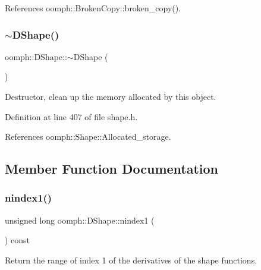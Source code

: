 References oomph\+::\+Broken\+Copy\+::broken\+\_\+copy().

\mbox{\label{classoomph_1_1DShape_a438b78cc767e134d1837bbf181cf4c07}} 
\subsubsection{\texorpdfstring{$\sim$\+D\+Shape()}{~DShape()}}
{\footnotesize\ttfamily oomph\+::\+D\+Shape\+::$\sim$\+D\+Shape (\begin{DoxyParamCaption}{ }\end{DoxyParamCaption})\hspace{0.3cm}{\ttfamily [inline]}}



Destructor, clean up the memory allocated by this object. 



Definition at line 407 of file shape.\+h.



References oomph\+::\+Shape\+::\+Allocated\+\_\+storage.



\subsection{Member Function Documentation}
\mbox{\label{classoomph_1_1DShape_a6c3a1de88d42417bbb35ad62655a5ed3}} 
\subsubsection{\texorpdfstring{nindex1()}{nindex1()}}
{\footnotesize\ttfamily unsigned long oomph\+::\+D\+Shape\+::nindex1 (\begin{DoxyParamCaption}{ }\end{DoxyParamCaption}) const\hspace{0.3cm}{\ttfamily [inline]}}



Return the range of index 1 of the derivatives of the shape functions. 



